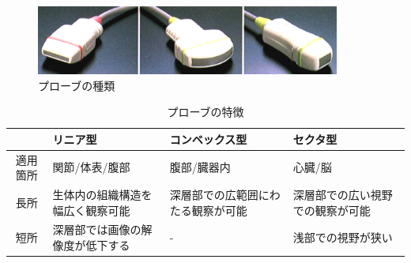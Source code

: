 \begin{figure}[H]
  \begin{center}
    \includegraphics[width=100mm]{fig/probe3.pdf}
  \end{center}
  \caption{プローブの種類}
\end{figure}

\begin{table}[htb]
\centering
\caption{プローブの特徴}
\label{table_probe}
\begin{tabular}{|c|p{3cm}|p{3cm}|p{3cm}|}%
\hline
  &\hfil リニア型 \hfil & \hfil コンベックス型 \hfil & \hfil セクタ型 \hfil  
  \\ \hline
\hfil 適用箇所 \hfil &\hfil 関節/体表/腹部 \hfil & \hfil 腹部/臓器内 \hfil & \hfil 心臓/脳 \hfil    
\\ \hline
長所   & \hfil 生体内の組織構造を幅広く観察可能 \hfil & \hfil  深層部での広範囲にわたる観察が可能 \hfil & \hfil 深層部での広い視野での観察が可能 \hfil
 \\ \hline
短所  & \hfil 深層部では画像の解像度が低下する\hfil &\hfil  - \hfil& \hfil 浅部での視野が狭い \hfil \\ \hline
\end{tabular}
\end{table}
